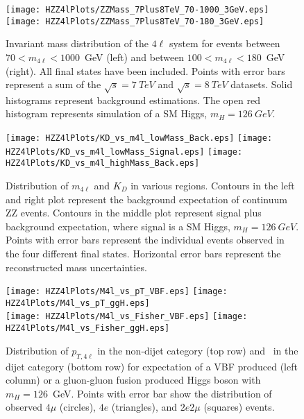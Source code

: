 \begin{figure}
\begin{center}
\texttt{[image: HZZ4lPlots/ZZMass\_7Plus8TeV\_70-1000\_3GeV.eps]}
\texttt{[image: HZZ4lPlots/ZZMass\_7Plus8TeV\_70-180\_3GeV.eps]}
\caption{Invariant mass distribution of the $4\ell$ system for
events between $70<m_{4\ell}<1000$~GeV (left) and between
$100<m_{4\ell}<180$~GeV (right).  All final states have been included.  
Points with error bars represent a sum of the $\sqrt{s}=7~TeV$
and $\sqrt{s}=8~TeV$ datasets.  Solid histograms represent
background estimations.  The open red histogram represents
simulation of a SM Higgs, $m_H=126~GeV$.}
\label{fig:HZZ4lMassDistribution}
\end{center}
\end{figure}

\begin{figure}
\begin{center}
\texttt{[image: HZZ4lPlots/KD\_vs\_m4l\_lowMass\_Back.eps]}
\texttt{[image: HZZ4lPlots/KD\_vs\_m4l\_lowMass\_Signal.eps]}
\texttt{[image: HZZ4lPlots/KD\_vs\_m4l\_highMass\_Back.eps]}
\caption{
Distribution of $m_{4\ell}$ and $K_D$ in various regions.  
Contours in the left and right plot represent the background 
expectation of continuum ZZ events.  Contours in the middle
plot represent signal plus background expectation, where signal
is a SM Higgs, $m_H=126~GeV$.  Points with error bars represent
the individual events observed in the four different final states.
Horizontal error bars represent the reconstructed mass
uncertainties.
}
\label{fig:HZZ4lMassKDdist}
\end{center}
\end{figure}


\begin{figure}
\begin{center}
\texttt{[image: HZZ4lPlots/M4l\_vs\_pT\_VBF.eps]}
\texttt{[image: HZZ4lPlots/M4l\_vs\_pT\_ggH.eps]}\\
\texttt{[image: HZZ4lPlots/M4l\_vs\_Fisher\_VBF.eps]}
\texttt{[image: HZZ4lPlots/M4l\_vs\_Fisher\_ggH.eps]}
\caption{Distribution of $p_{T,4\ell}$ in the non-dijet category (top row) and 
\Djet~in the dijet category (bottom row) for expectation of a VBF produced (left column) 
or a gluon-gluon fusion produced Higgs boson with $m_H=126$~GeV.
Points with error bar show the distribution of observed $4\mu$ (circles), $4e$ (triangles), 
and $2e2\mu$ (squares) events.}
\label{fig:HZZ4lVBFvars}
\end{center}
\end{figure}


